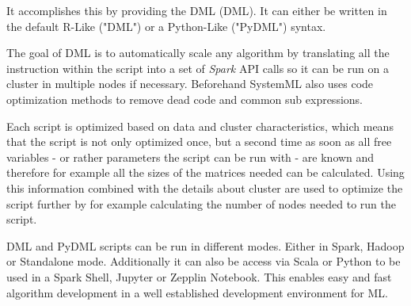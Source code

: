 It accomplishes this by providing the \acl{DML} (\acs{DML}). It can either be written in the default R-Like ("DML") or a Python-Like ("PyDML") syntax.

The goal of \acs{DML} is to automatically scale any algorithm by translating all the instruction within the script into a set of \textit{Spark} \acs{API} calls so it can be run on a cluster in multiple nodes if necessary. Beforehand SystemML also uses code optimization methods to remove dead code and common sub expressions.

Each script is optimized based on data and cluster characteristics, which means that the script is not only optimized once, but a second time as soon as all free variables - or rather parameters the script can be run with - are known and therefore for example all the sizes of the matrices needed can be calculated. Using this information combined with the details about cluster are used to optimize the script further by for example calculating the number of nodes needed to run the script.

DML and PyDML scripts can be run in different modes. Either in Spark, Hadoop or Standalone mode. Additionally it can also be access via Scala or Python to be used in a Spark Shell, Jupyter or Zepplin Notebook. This enables easy and fast algorithm development in a well established development environment for ML.
 


















